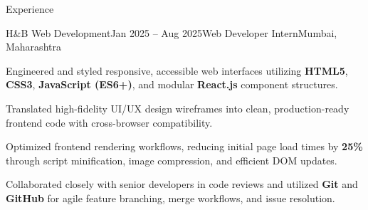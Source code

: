 \documentclass{resume} %
\begin{document}
\begin{rSection}{Experience}

\begin{rSubsection}{H\&B Web Development}{Jan 2025 -- Aug 2025}{Web Developer Intern}{Mumbai, Maharashtra}
\item Engineered and styled responsive, accessible web interfaces utilizing \textbf{HTML5}, \textbf{CSS3}, \textbf{JavaScript (ES6+)}, and modular \textbf{React.js} component structures.
\item Translated high-fidelity UI/UX design wireframes into clean, production-ready frontend code with cross-browser compatibility.
\item Optimized frontend rendering workflows, reducing initial page load times by \textbf{25\%} through script minification, image compression, and efficient DOM updates.
\item Collaborated closely with senior developers in code reviews and utilized \textbf{Git} and \textbf{GitHub} for agile feature branching, merge workflows, and issue resolution.
\end{rSubsection}

\end{rSection}
\end{document}
